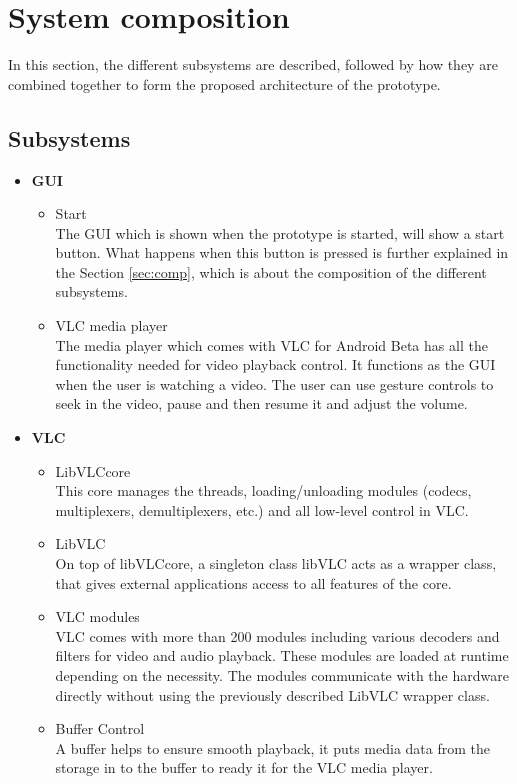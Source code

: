 \section{System composition}
In this section, the different subsystems are described, followed by how they are combined together to form the proposed architecture of the prototype.
\subsection{Subsystems}
\begin{itemize}
\item \textbf{GUI}
	\begin{itemize}
		\item Start\\
The GUI which is shown when the prototype is started, will show a start button. What happens when this button is pressed is further explained in the Section \ref{sec:comp}, which is about the composition of the different subsystems.
		\item VLC media player\\
The media player which comes with VLC for Android Beta has all the functionality needed for video playback control. It functions as the GUI when the user is watching a video. The user can use gesture controls to seek in the video, pause and then resume it and adjust the volume.
	\end{itemize}
\item \textbf{VLC}
	\begin{itemize}
		\item LibVLCcore\\
This core manages the threads, loading/unloading modules (codecs, multiplexers, demultiplexers, etc.) and all low-level control in VLC.
		\item LibVLC\\
On top of libVLCcore, a singleton class libVLC acts as a wrapper class, that gives external applications access to all features of the core.
		\item VLC modules\\
VLC comes with more than 200 modules including various decoders and filters for video and audio playback. These modules are loaded at runtime depending on the necessity. The modules communicate with the hardware directly without using the previously described LibVLC wrapper class.
		\item Buffer Control\\
A buffer helps to ensure smooth playback, it puts media data from the storage in to the buffer to ready it for the VLC media player.

\end{itemize}
\end{itemize}
